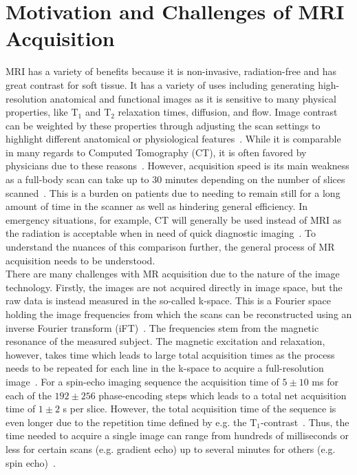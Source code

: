 \section{Motivation and Challenges of MRI Acquisition} \label{Sec:MotivationChallengesMRIAcquisition}
MRI has a variety of benefits because it is non-invasive, radiation-free and has great contrast for soft tissue. It has a variety of uses including generating high-resolution anatomical and functional images as it is sensitive to many physical properties, like $\text{T}_1$ and $\text{T}_2$ relaxation times, diffusion, and flow. Image contrast can be weighted by these properties through adjusting the scan settings to highlight different anatomical or physiological features~\cite{AdvancesPI}. While it is comparable in many regards to Computed Tomography (CT), it is often favored by physicians due to these reasons~\cite{Liu2013}. However, acquisition speed is its main weakness as a full-body scan can take up to 30 minutes depending on the number of slices scanned~\cite{Brown2014,PulseSequences}. This is a burden on patients due to needing to remain still for a long amount of time in the scanner as well as hindering general efficiency. In emergency situations, for example, CT will generally be used instead of MRI as the radiation is acceptable when in need of quick diagnostic imaging~\cite{Liu2013}. To understand the nuances of this comparison further, the general process of MR acquisition needs to be understood.\\
There are many challenges with MR acquisition due to the nature of the image technology. Firstly, the images are not acquired directly in image space, but the raw data is instead measured in the so-called k-space. This is a Fourier space holding the image frequencies from which the scans can be reconstructed using an inverse Fourier transform (iFT)~\cite{Brown2014}. The frequencies stem from the magnetic resonance of the measured subject. The magnetic excitation and relaxation, however, takes time which leads to large total acquisition times as the process needs to be repeated for each line in the k-space to acquire a full-resolution image~\cite{AdvancesPI}. For a spin-echo imaging sequence the acquisition time of $5 \pm 10$ ms for each of the $192 \pm 256$ phase-encoding steps which leads to a total net acquisition time of $1 \pm 2$ s per slice. However, the total acquisition time of the sequence is even longer due to the repetition time defined by e.g. the $\text{T}_1$-contrast~\cite{SamplingStrategies}. Thus, the time needed to
acquire a single image can range from hundreds of milliseconds or less for certain scans (e.g. gradient echo) up to several minutes for others (e.g. spin echo)~\cite{AdvancesPI}.\\
